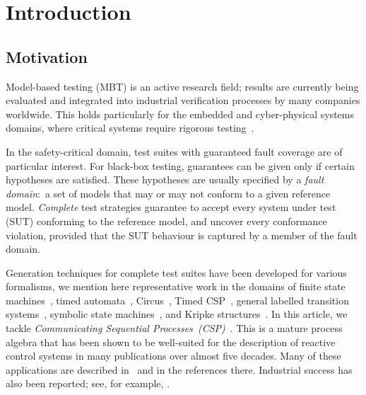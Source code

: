 
\section{Introduction}
\label{sec:intro}


\subsection{Motivation}

Model-based testing (MBT) is an active research field; results are currently
being evaluated and integrated into industrial verification processes by many
companies worldwide. 
This holds particularly for the embedded and
cyber-physical systems domains, where critical systems require rigorous
testing~\cite{jp2018ets,DBLP:conf/isola/0001BH18}.

In the safety-critical domain, test suites with guaranteed fault coverage are
of particular interest. For black-box testing, guarantees can be given only
if certain hypotheses are satisfied. These hypotheses are usually specified
by a \emph{fault domain}:~a set of models that may or may not conform to a
given reference model. \emph{Complete} test strategies guarantee to accept
every  system under test (SUT) conforming to the reference model, and uncover
every conformance violation, provided that the SUT behaviour is captured by a
member of the fault domain.

Generation techniques for complete test suites have been developed for
various formalisms, we mention here representative work in the domains of 
finite state machines~\cite{hierons_testing_2004,simao_reducing_2012}, timed automata~\cite{Springintveld2001}, Circus~\cite{DBLP:journals/acta/CavalcantiG11}, 
Timed CSP~\cite{Schneider:1995:OST:203471.203475},
general labelled transition systems~\cite{DBLP:journals/cn/Tretmans96}, symbolic state machines~\cite{DBLP:conf/icst/Petrenko16}, and Kripke structures~\cite{Huang2017}. In this article, we tackle \emph{Communicating Sequential
Processes~(CSP)}~\cite{Hoare:1985:CSP:3921,Roscoe2010}. This is a mature
process algebra that has been shown to be well-suited for the description of
reactive control systems in many publications over almost five decades. Many
of these applications are described in~\cite{Roscoe2010} and in the
references there. Industrial success has also been reported; see, for
example, \cite{976937,DBLP:conf/prdc/ShiPK99,DBLP:conf/amast/ButhKPS97}.

